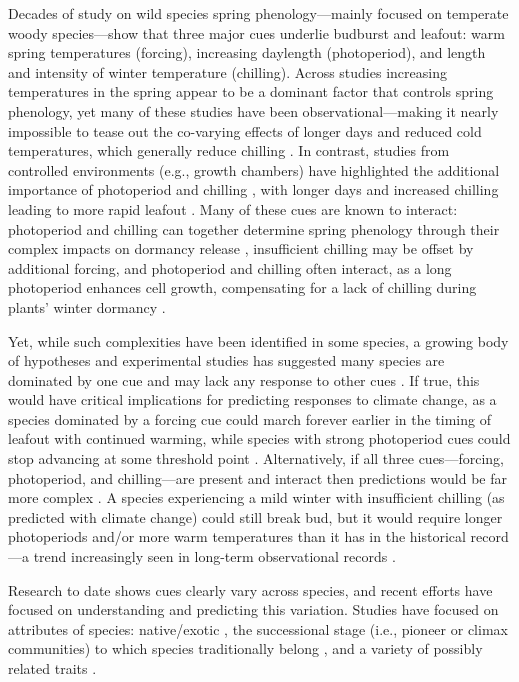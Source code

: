 \documentclass[11pt]{article}
\begin{document}
Decades of study on wild species spring phenology---mainly focused on temperate woody species---show that three major cues underlie budburst and leafout: warm spring temperatures (forcing), increasing daylength (photoperiod), and length and intensity of winter temperature (chilling). Across studies increasing temperatures in the spring appear to be a dominant factor that controls spring phenology, yet many of these studies have been observational---making it nearly impossible to tease out the co-varying effects of longer days and reduced cold temperatures, which generally reduce chilling \citep{chuineJTB,Cook:2012pnas}. In contrast, studies from controlled environments (e.g., growth chambers) have highlighted the additional importance of photoperiod and chilling \citep{Heide:1993b,Falusi:1996aa,Foley:2009aa,Ghelardini:2010aa,Caffarra:2011aa}, with longer days and increased chilling leading to more rapid leafout \citep{Caffarra:2011ab}. Many of these cues are known to interact: photoperiod and chilling can together determine spring phenology through their complex impacts on dormancy release \citep{chuineJTB}, insufficient chilling may be offset by additional forcing, and photoperiod and chilling often interact, as a long photoperiod enhances cell growth, compensating for a lack of chilling during plants' winter dormancy \citep{Heide:1993b,Myking:1995,Caffarra:2011aa}.

Yet, while such complexities have been identified in some species, a growing body of hypotheses and experimental studies has suggested many species are dominated by one cue and may lack any response to other cues \citep{Korner:2010}. If true, this would have critical implications for predicting responses to climate change, as a species dominated by a forcing cue could march forever earlier in the timing of leafout with continued warming, while species with strong photoperiod cues could stop advancing at some threshold point \citep{Korner:2010}. Alternatively, if all three cues---forcing, photoperiod, and chilling---are present and interact then predictions would be far more complex \citep{Chuine:1999aa}. A species experiencing a mild winter with insufficient chilling (as predicted with climate change) could still break bud, but it would require longer photoperiods and/or more warm temperatures \citep{Heide:1993b} than it has in the historical record---a trend increasingly seen in long-term observational records \citep[e.g,][]{fu2015,carter2017}. 

Research to date shows cues clearly vary across species, and recent efforts have focused on understanding and predicting this variation. Studies have focused on attributes of species: native/exotic \citep{Willis:2010al}, the successional stage (i.e., pioneer or climax communities) to which species traditionally belong \citep{laube2014gcb,Basler:2012aa}, and a variety of possibly related traits \citep{Lechowicz:1984aa,Polgar:2014aa}. 
\end{document}
